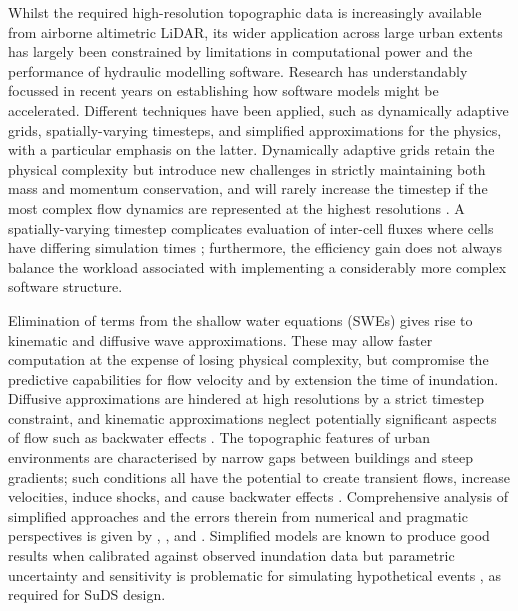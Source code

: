 Whilst the required high-resolution topographic data is increasingly available from airborne altimetric LiDAR, its wider application across large urban extents has largely been constrained by limitations in computational power and the performance of hydraulic modelling software. Research has understandably focussed in recent years on establishing how software models might be accelerated. Different techniques have been applied, such as dynamically adaptive grids, spatially-varying timesteps, and simplified approximations for the physics, with a particular emphasis on the latter. Dynamically adaptive grids retain the physical complexity but introduce new challenges in strictly maintaining both mass and momentum conservation, and will rarely increase the timestep if the most complex flow dynamics are represented at the highest resolutions \citep[e.g.][]{Liang2008,Kubatko2009}. A spatially-varying timestep complicates evaluation of inter-cell fluxes where cells have differing simulation times \citep{Sanders2011,Trahan2012}; furthermore, the efficiency gain does not always balance the workload associated with implementing a considerably more complex software structure. 

Elimination of terms from the shallow water equations (SWEs) gives rise to kinematic and diffusive wave approximations. These may allow faster computation at the expense of losing physical complexity, but compromise the predictive capabilities for flow velocity and by extension the time of inundation. Diffusive approximations are hindered at high resolutions by a strict timestep constraint, and kinematic approximations neglect potentially significant aspects of flow such as backwater effects \citep{Bates2000,Tsai2003,Hunter2005}. The topographic features of urban environments are characterised by narrow gaps between buildings and steep gradients; such conditions all have the potential to create transient flows, increase velocities, induce shocks, and cause backwater effects \citep{Testa2007,ElKadiAbderrezzak2011,Xia2011}. Comprehensive analysis of simplified approaches and the errors therein from numerical and pragmatic perspectives is given by \citet{Singh1996}, \citet{Hunter2007}, and \citet{Pender2010,Pender2013}. Simplified models are known to produce good results when calibrated against observed inundation data \citep[e.g.][]{Neal2009,Horritt2010} but parametric uncertainty and sensitivity is problematic for simulating hypothetical events \citep{Horritt2002,Yu2006,Fewtrell2008a}, as required for SuDS design.

